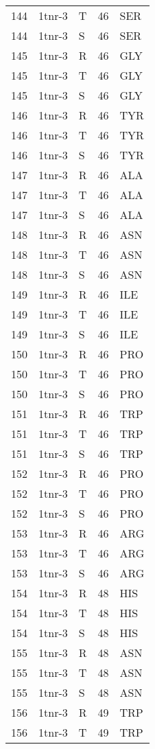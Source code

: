 \begin{longtable}[l]{l|l|l|l|l}
	144 & 1tnr-3 & T & 46 & SER \\
	144 & 1tnr-3 & S & 46 & SER \\
	145 & 1tnr-3 & R & 46 & GLY \\
	145 & 1tnr-3 & T & 46 & GLY \\
	145 & 1tnr-3 & S & 46 & GLY \\
	146 & 1tnr-3 & R & 46 & TYR \\
	146 & 1tnr-3 & T & 46 & TYR \\
	146 & 1tnr-3 & S & 46 & TYR \\
	147 & 1tnr-3 & R & 46 & ALA \\
	147 & 1tnr-3 & T & 46 & ALA \\
	147 & 1tnr-3 & S & 46 & ALA \\
	148 & 1tnr-3 & R & 46 & ASN \\
	148 & 1tnr-3 & T & 46 & ASN \\
	148 & 1tnr-3 & S & 46 & ASN \\
	149 & 1tnr-3 & R & 46 & ILE \\
	149 & 1tnr-3 & T & 46 & ILE \\
	149 & 1tnr-3 & S & 46 & ILE \\
	150 & 1tnr-3 & R & 46 & PRO \\
	150 & 1tnr-3 & T & 46 & PRO \\
	150 & 1tnr-3 & S & 46 & PRO \\
	151 & 1tnr-3 & R & 46 & TRP \\
	151 & 1tnr-3 & T & 46 & TRP \\
	151 & 1tnr-3 & S & 46 & TRP \\
	152 & 1tnr-3 & R & 46 & PRO \\
	152 & 1tnr-3 & T & 46 & PRO \\
	152 & 1tnr-3 & S & 46 & PRO \\
	153 & 1tnr-3 & R & 46 & ARG \\
	153 & 1tnr-3 & T & 46 & ARG \\
	153 & 1tnr-3 & S & 46 & ARG \\
	154 & 1tnr-3 & R & 48 & HIS \\
	154 & 1tnr-3 & T & 48 & HIS \\
	154 & 1tnr-3 & S & 48 & HIS \\
	155 & 1tnr-3 & R & 48 & ASN \\
	155 & 1tnr-3 & T & 48 & ASN \\
	155 & 1tnr-3 & S & 48 & ASN \\
	156 & 1tnr-3 & R & 49 & TRP \\
	156 & 1tnr-3 & T & 49 & TRP \\

\end{longtable}
